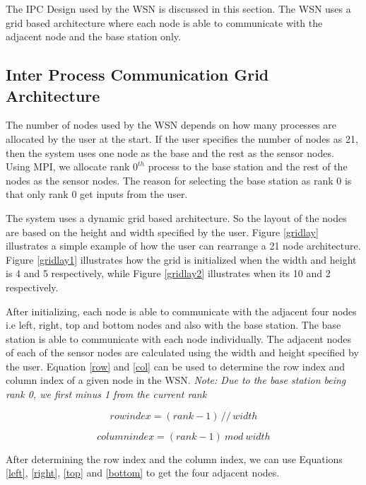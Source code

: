 \documentclass[conference]{IEEEtran}
\begin{document}
	The IPC Design used by the WSN is discussed in this section. The WSN uses a grid based architecture where each node is able to communicate with the adjacent node and the base station only.
	
	\subsection{ Inter Process Communication Grid Architecture}\label{IPCArc}
	
	The number of nodes used by the WSN depends on how many processes are allocated by the user at the start. If the user specifies the number of nodes as 21, then the system uses one node as the base and the rest as the sensor nodes. Using MPI, we allocate rank $0^{th}$ process to the base station and the rest of the nodes as the sensor nodes. The reason for selecting the base station as rank 0 is that only rank 0 get inputs from the user.
	
	The system uses a dynamic grid based architecture. So the layout of the nodes are based on the height and width specified by the user. Figure \ref{gridlay}  illustrates a simple example of how the user can rearrange a 21 node architecture. Figure \ref{gridlay1} illustrates how the grid is initialized when the width and height is 4 and 5 respectively, while Figure \ref{gridlay2} illustrates when its 10 and 2 respectively.
	
	After initializing, each node is able to communicate with the adjacent four nodes i.e left, right, top and bottom nodes and also with the base station. The base station is able to communicate with each node individually. The adjacent nodes of each of the sensor nodes are calculated using the width and height specified by the user. Equation \ref{row} and \ref{col} can be used to determine the row index and column index of a given node in the WSN. \emph{Note: Due to the base station being rank 0, we first minus 1 from the current rank}

	
	\begin{equation}
	row index = (rank - 1) \, // \, width
	\label{row}
	\end{equation}
	
	
	\begin{equation}
	column index = (rank - 1) \ mod \ width
	\label{col}
	\end{equation}
	
	After determining the row index and the column index, we can use Equations \ref{left}, \ref{right}, \ref{top} and \ref{bottom} to get the four adjacent nodes. 
	
\end{document}
